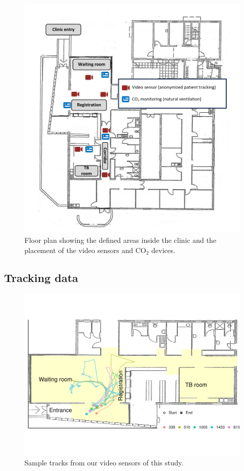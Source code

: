 \documentclass[fleqn,11pt]{wlscirep_supp}
\begin{document}
\begin{figure}[!htpb]
    \centering
    \includegraphics{doc/paper/floor_plan_2021.pdf}
    \caption{Floor plan showing the defined areas inside the clinic and the placement of the video sensors and CO$_2$ devices.}
    \label{fig:floor-plan}
\end{figure}

\clearpage

\subsection{Tracking data}

\begin{figure}[!htpb]
    \centering
    \includegraphics{illustrations/tracking-examples.pdf}
    \caption{Sample tracks from our video sensors of this study.}
    \label{fig:tracking-examples}
\end{figure}
\end{document}
